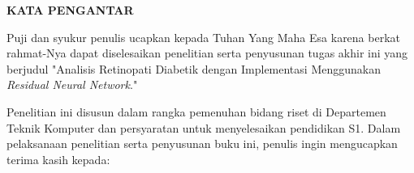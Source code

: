 \begin{center}
  \Large
  \textbf{KATA PENGANTAR}
\end{center}


\vspace{2ex}


Puji dan syukur penulis ucapkan kepada Tuhan Yang Maha Esa karena berkat rahmat-Nya dapat diselesaikan penelitian serta penyusunan tugas akhir ini yang berjudul "Analisis Retinopati Diabetik dengan Implementasi Menggunakan \emph{Residual Neural Network}."

Penelitian ini disusun dalam rangka pemenuhan bidang riset di Departemen Teknik Komputer dan persyaratan untuk menyelesaikan pendidikan S1. Dalam pelaksanaan penelitian serta penyusunan buku ini, penulis ingin mengucapkan terima kasih kepada:


